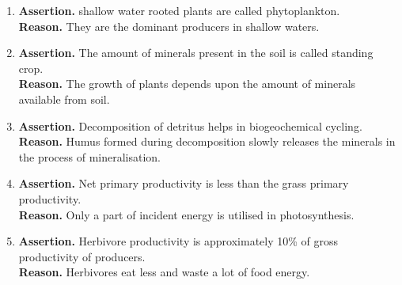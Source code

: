\documentclass{article}
\begin{document}
\begin{enumerate}
    \item \textbf{Assertion.} shallow water rooted plants are called phytoplankton. \\
    \textbf{Reason.} They are the dominant producers in shallow waters.
    \item \textbf{Assertion.} The amount of minerals present in the soil is called standing crop. \\
    \textbf{Reason.} The growth of plants depends upon the amount of minerals available from soil.
    \item \textbf{Assertion.} Decomposition of detritus helps in biogeochemical cycling. \\
    \textbf{Reason.} Humus formed during decomposition slowly releases the minerals in the process of mineralisation.
    \item \textbf{Assertion.} Net primary productivity is less than the grass primary productivity. \\
    \textbf{Reason.} Only a part of incident energy is utilised in photosynthesis.
    \item \textbf{Assertion.} Herbivore productivity is approximately 10\% of gross productivity of producers. \\
    \textbf{Reason.} Herbivores eat less and waste a lot of food energy.
\end{enumerate}
\end{document}

